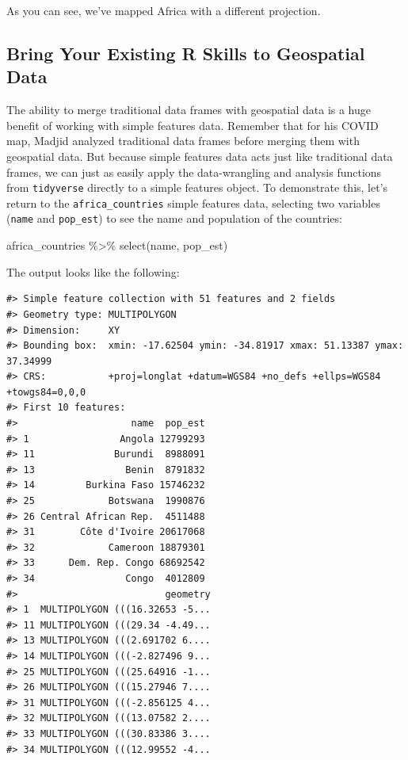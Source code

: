 \documentclass[
]{book}
\newenvironment{Shaded}{\begin{snugshade}}{\end{snugshade}}
\newcommand{\FunctionTok}[1]{\textcolor[rgb]{0.00,0.00,0.00}{#1}}
\newcommand{\NormalTok}[1]{#1}
\newcommand{\SpecialCharTok}[1]{\textcolor[rgb]{0.00,0.00,0.00}{#1}}
\begin{document}
As you can see, we've mapped Africa with a different projection.

\hypertarget{bring-your-existing-r-skills-to-geospatial-data}{%
\subsection*{Bring Your Existing R Skills to Geospatial Data}\label{bring-your-existing-r-skills-to-geospatial-data}}

The ability to merge traditional data frames with geospatial data is a huge benefit of working with simple features data. Remember that for his COVID map, Madjid analyzed traditional data frames before merging them with geospatial data. But because simple features data acts just like traditional data frames, we can just as easily apply the data-wrangling and analysis functions from \texttt{tidyverse} directly to a simple features object. To demonstrate this, let's return to the \texttt{africa\_countries} simple features data, selecting two variables (\texttt{name} and \texttt{pop\_est}) to see the name and population of the countries:

\begin{Shaded}
\begin{Highlighting}[]
\NormalTok{africa\_countries }\SpecialCharTok{\%\textgreater{}\%} 
  \FunctionTok{select}\NormalTok{(name, pop\_est)}
\end{Highlighting}
\end{Shaded}

The output looks like the following:

\begin{verbatim}
#> Simple feature collection with 51 features and 2 fields
#> Geometry type: MULTIPOLYGON
#> Dimension:     XY
#> Bounding box:  xmin: -17.62504 ymin: -34.81917 xmax: 51.13387 ymax: 37.34999
#> CRS:           +proj=longlat +datum=WGS84 +no_defs +ellps=WGS84 +towgs84=0,0,0
#> First 10 features:
#>                    name  pop_est
#> 1                Angola 12799293
#> 11              Burundi  8988091
#> 13                Benin  8791832
#> 14         Burkina Faso 15746232
#> 25             Botswana  1990876
#> 26 Central African Rep.  4511488
#> 31        Côte d'Ivoire 20617068
#> 32             Cameroon 18879301
#> 33      Dem. Rep. Congo 68692542
#> 34                Congo  4012809
#>                          geometry
#> 1  MULTIPOLYGON (((16.32653 -5...
#> 11 MULTIPOLYGON (((29.34 -4.49...
#> 13 MULTIPOLYGON (((2.691702 6....
#> 14 MULTIPOLYGON (((-2.827496 9...
#> 25 MULTIPOLYGON (((25.64916 -1...
#> 26 MULTIPOLYGON (((15.27946 7....
#> 31 MULTIPOLYGON (((-2.856125 4...
#> 32 MULTIPOLYGON (((13.07582 2....
#> 33 MULTIPOLYGON (((30.83386 3....
#> 34 MULTIPOLYGON (((12.99552 -4...
\end{verbatim}
\end{document}
